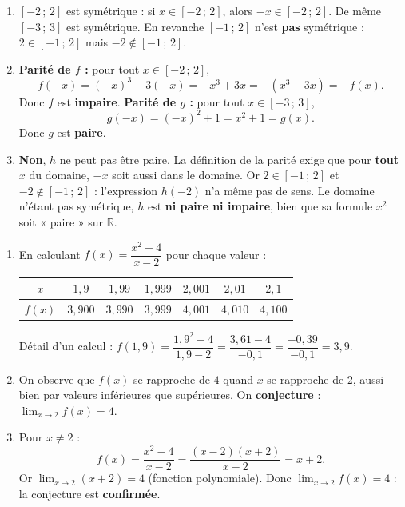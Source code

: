 \documentclass[11pt]{article}
\begin{document}
\begin{corrige}
\begin{enumerate}
\item $[-2\,;\,2]$ est symétrique : si $x\in[-2\,;\,2]$, alors $-x\in[-2\,;\,2]$. De même $[-3\,;\,3]$ est symétrique. En revanche $[-1\,;\,2]$ n'est \textbf{pas} symétrique : $2\in[-1\,;\,2]$ mais $-2\notin[-1\,;\,2]$.
\item \textbf{Parité de $f$ :} pour tout $x\in[-2\,;\,2]$,
\[ f(-x)=(-x)^3-3(-x)=-x^3+3x=-(x^3-3x)=-f(x). \]
Donc $f$ est \textbf{impaire}.
\textbf{Parité de $g$ :} pour tout $x\in[-3\,;\,3]$,
\[ g(-x)=(-x)^2+1=x^2+1=g(x). \]
Donc $g$ est \textbf{paire}.
\item \textbf{Non}, $h$ ne peut pas être paire. La définition de la parité exige que pour \textbf{tout} $x$ du domaine, $-x$ soit aussi dans le domaine. Or $2\in[-1\,;\,2]$ et $-2\notin[-1\,;\,2]$ : l'expression $h(-2)$ n'a même pas de sens. Le domaine n'étant pas symétrique, $h$ est \textbf{ni paire ni impaire}, bien que sa formule $x^2$ soit « paire » sur $\mathbb{R}$.
\end{enumerate}
\end{corrige}

\begin{corrige}
\begin{enumerate}
\item En calculant $f(x)=\dfrac{x^2-4}{x-2}$ pour chaque valeur :
\begin{center}
\begin{tabular}{|c|cccccc|}\hline
$x$ & $1,9$ & $1,99$ & $1,999$ & $2,001$ & $2,01$ & $2,1$ \\ \hline
$f(x)$ & $3,900$ & $3,990$ & $3,999$ & $4,001$ & $4,010$ & $4,100$ \\ \hline
\end{tabular}
\end{center}
Détail d'un calcul : $f(1,9)=\dfrac{1,9^2-4}{1,9-2}=\dfrac{3,61-4}{-0,1}=\dfrac{-0,39}{-0,1}=3,9$.
\item On observe que $f(x)$ se rapproche de $4$ quand $x$ se rapproche de $2$, aussi bien par valeurs inférieures que supérieures. On \textbf{conjecture} : $\displaystyle\lim_{x\to 2}f(x)=4$.
\item Pour $x\neq 2$ :
\[ f(x)=\frac{x^2-4}{x-2}=\frac{(x-2)(x+2)}{x-2}=x+2. \]
Or $\displaystyle\lim_{x\to 2}(x+2)=4$ (fonction polynomiale). Donc $\displaystyle\lim_{x\to 2}f(x)=4$ : la conjecture est \textbf{confirmée}.
\end{enumerate}
\end{corrige}
\end{document}
